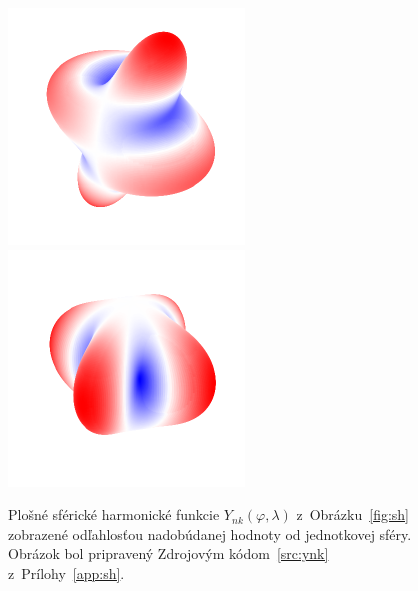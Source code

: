 \documentclass[a4paper, 12pt]{book}
\begin{document}
\begin{figure}[bt]
\includegraphics{./fig-spherical-harmonic-n4-k1-3d.pdf}
\includegraphics{./fig-spherical-harmonic-n4-k4-3d.pdf}
\caption{Plošné sférické harmonické funkcie $Y_{nk}(\varphi, \lambda)$
z~Obrázku~\ref{fig:sh} zobrazené odľahlosťou nadobúdanej hodnoty od jednotkovej
sféry.  Obrázok bol pripravený Zdrojovým kódom~\ref{src:ynk}
z~Prílohy~\ref{app:sh}.}
\label{fig:sh3d}
\end{figure}
\end{document}
